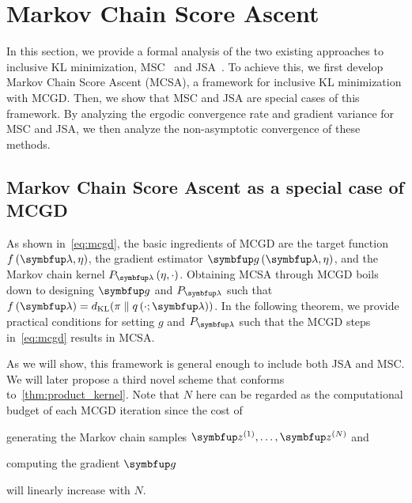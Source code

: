 
\vspace{-0.05in}
\section{Markov Chain Score Ascent}
\vspace{-0.05in}

In this section, we provide a formal analysis of the two existing approaches to inclusive KL minimization, MSC~\citet{NEURIPS2020_b2070693} and JSA~\citet{pmlr-v124-ou20a}.
To achieve this, we first develop Markov Chain Score Ascent (MCSA), a framework for inclusive KL minimization with MCGD.
Then, we show that MSC and JSA are special cases of this framework.
By analyzing the ergodic convergence rate and gradient variance for MSC and JSA, we then analyze the non-asymptotic convergence of these methods.

\vspace{-0.05in}
\subsection{Markov Chain Score Ascent as a special case of MCGD}\label{section:convergence}

\vspace{-0.05in}
As shown in~\cref{eq:mcgd}, the basic ingredients of MCGD are the target function \(f\left(\vlambda, \eta\right)\), the gradient estimator \(\vg\left(\vlambda, \eta\right)\), and the Markov chain kernel \(P_{\vlambda}\left(\eta, \cdot\right)\).
Obtaining MCSA through MCGD boils down to designing \(\vg\) and \(P_{\vlambda}\) such that \(f\left(\vlambda\right) = \DKL{\pi}{q\left(\cdot; \vlambda\right)} \).
In the following theorem, we provide practical conditions for setting \(g\) and \(P_{\vlambda}\) such that the MCGD steps in~\cref{eq:mcgd} results in MCSA.



As we will show, this framework is general enough to include both JSA and MSC.
We will later propose a third novel scheme that conforms to~\cref{thm:product_kernel}.
Note that \(N\) here can be regarded as the computational budget of each MCGD iteration since the cost of
\begin{enumerate*}[label=\textbf{(\roman*)}]
  \item generating the Markov chain samples \(\vz^{(1)}, \ldots, \vz^{(N)}\) and
  \item computing the gradient \(\vg\)
\end{enumerate*}
will linearly increase with \(N\).

